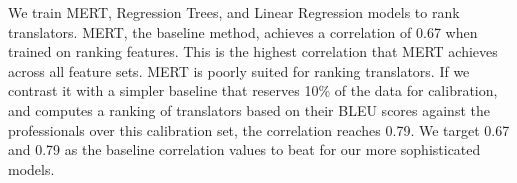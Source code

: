 \documentclass[11pt]{article}
\begin{document}
We train MERT, Regression Trees, and Linear Regression models to rank translators. MERT, the baseline method, achieves a correlation of  0.67 when trained on ranking features. This is the highest correlation that  MERT achieves across all feature sets. MERT is poorly suited for ranking translators.  If we contrast it with a simpler baseline that reserves 10\% of the data for calibration, and computes a ranking of translators based on their BLEU scores against the professionals over this calibration set, the correlation reaches 0.79.   We target 0.67 and 0.79 as the baseline correlation values to beat for our more sophisticated models.
%
\end{document}
